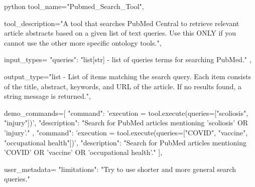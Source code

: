 \begin{codecolorbox}{python}
tool_name="Pubmed_Search_Tool",

tool_description="A tool that searches PubMed Central to retrieve relevant article abstracts based on a given list of text queries. Use this ONLY if you cannot use the other more specific ontology tools.",

input_types={
    "queries": "list[str] - list of queries terms for searching PubMed."
},

output_type="list - List of items matching the search query. Each item consists of the title, abstract, keywords, and URL of the article. If no results found, a string message is returned.",

demo_commands=[
    {
        "command": 'execution = tool.execute(queries=["scoliosis", "injury"])',
        "description": "Search for PubMed articles mentioning 'scoliosis' OR 'injury'."
    },
    {
        "command": 'execution = tool.execute(queries=["COVID", "vaccine", "occupational health"])',
        "description": "Search for PubMed articles mentioning 'COVID' OR 'vaccine' OR 'occupational health'."
    }
],

user_metadata={
    "limitations": "Try to use shorter and more general search queries."
}
\end{codecolorbox}


